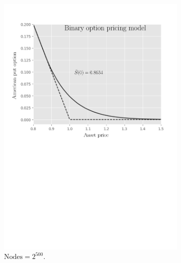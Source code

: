 \begin{figure}[H]
  \centering
  \begin{subfigure}{0.4\textwidth}
    \centering
    \includegraphics[width=\textwidth]{chapters/chapter5/TestCase2LcpBOPM.pdf}
    \caption{$\text{Nodes} = 2^{500}$.}
    \label{fig:lcp:numericaresults:test_case_2_bopm}
  \end{subfigure}
  \hspace{0.5cm}
  \begin{subfigure}{0.4\textwidth}
    \centering

\end{subfigure}
\end{figure}
